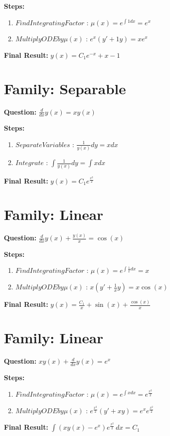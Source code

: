 \documentclass{article}
\begin{document}
\textbf{Steps:}
\begin{enumerate}
\item $Find Integrating Factor$ :  $\mu(x) = e^{\int 1 dx} = e^{x}$
\item $Multiply ODE by \mu(x)$ :  $e^{x}(y' + 1y) = x e^{x}$
\end{enumerate}
\textbf{Final Result:} $y{\left(x \right)} = C_{1} e^{- x} + x - 1$

\section*{Family: Separable}
\textbf{Question:} $\frac{d}{d x} y{\left(x \right)} = x y{\left(x \right)}$

\textbf{Steps:}
\begin{enumerate}
\item $Separate Variables$ :  $\frac{1}{y{\left(x \right)}} dy = x dx$
\item $Integrate$ :  $\int \frac{1}{y{\left(x \right)}} dy = \int x dx$
\end{enumerate}
\textbf{Final Result:} $y{\left(x \right)} = C_{1} e^{\frac{x^{2}}{2}}$

\section*{Family: Linear}
\textbf{Question:} $\frac{d}{d x} y{\left(x \right)} + \frac{y{\left(x \right)}}{x} = \cos{\left(x \right)}$

\textbf{Steps:}
\begin{enumerate}
\item $Find Integrating Factor$ :  $\mu(x) = e^{\int \frac{1}{x} dx} = x$
\item $Multiply ODE by \mu(x)$ :  $x(y' + \frac{1}{x}y) = x \cos{\left(x \right)}$
\end{enumerate}
\textbf{Final Result:} $y{\left(x \right)} = \frac{C_{1}}{x} + \sin{\left(x \right)} + \frac{\cos{\left(x \right)}}{x}$

\section*{Family: Linear}
\textbf{Question:} $x y{\left(x \right)} + \frac{d}{d x} y{\left(x \right)} = e^{x}$

\textbf{Steps:}
\begin{enumerate}
\item $Find Integrating Factor$ :  $\mu(x) = e^{\int x dx} = e^{\frac{x^{2}}{2}}$
\item $Multiply ODE by \mu(x)$ :  $e^{\frac{x^{2}}{2}}(y' + xy) = e^{x} e^{\frac{x^{2}}{2}}$
\end{enumerate}
\textbf{Final Result:} $\int \left(x y{\left(x \right)} - e^{x}\right) e^{\frac{x^{2}}{2}}\, dx = C_{1}$
\end{document}
